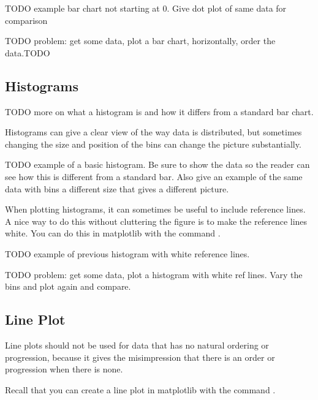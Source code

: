 TODO  example bar chart not starting at 0.  Give dot plot of same data for comparison 


\begin{problem}
TODO problem: get some data, plot a bar chart, horizontally,  order the data.TODO
\end{problem}





\subsection*{Histograms}

TODO more on what a histogram is and how it differs from a standard bar chart.

Histograms can give a clear view of the way data is distributed, but sometimes changing the size and position of the bins can change the picture substantially.


TODO example of a basic histogram.  Be sure to show the data so the reader can see how this is different from a standard bar.  Also give an example of the same data with bins a different size that gives a different picture.

When plotting histograms, it can sometimes be useful to include reference lines.  A nice way to do this without cluttering the figure is to make the reference lines white.  You can do this in matplotlib with the command .

TODO example of previous histogram with white reference lines.


\begin{problem}
TODO problem: get some data, plot a histogram with white ref lines. Vary the bins and plot again and compare.\end{problem}





\subsection*{Line Plot}

Line plots should not be used for data that has no natural ordering or progression, because it gives the misimpression that there is an order or progression when there is none.

Recall that you can create a line plot in matplotlib with the command .


